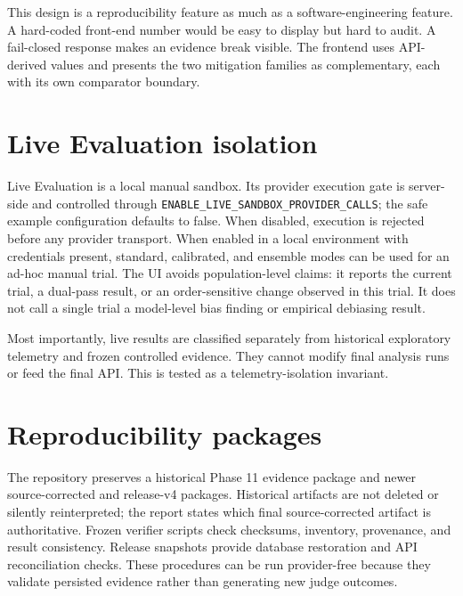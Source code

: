This design is a reproducibility feature as much as a software-engineering feature. A hard-coded front-end number would be easy to display but hard to audit. A fail-closed response makes an evidence break visible. The frontend uses API-derived values and presents the two mitigation families as complementary, each with its own comparator boundary.

\section{Live Evaluation isolation}

Live Evaluation is a local manual sandbox. Its provider execution gate is server-side and controlled through \texttt{ENABLE\_LIVE\_SANDBOX\_PROVIDER\_CALLS}; the safe example configuration defaults to false. When disabled, execution is rejected before any provider transport. When enabled in a local environment with credentials present, standard, calibrated, and ensemble modes can be used for an ad-hoc manual trial. The UI avoids population-level claims: it reports the current trial, a dual-pass result, or an order-sensitive change observed in this trial. It does not call a single trial a model-level bias finding or empirical debiasing result.

Most importantly, live results are classified separately from historical exploratory telemetry and frozen controlled evidence. They cannot modify final analysis runs or feed the final API. This is tested as a telemetry-isolation invariant.

\section{Reproducibility packages}

The repository preserves a historical Phase 11 evidence package and newer source-corrected and release-v4 packages. Historical artifacts are not deleted or silently reinterpreted; the report states which final source-corrected artifact is authoritative. Frozen verifier scripts check checksums, inventory, provenance, and result consistency. Release snapshots provide database restoration and API reconciliation checks. These procedures can be run provider-free because they validate persisted evidence rather than generating new judge outcomes.

